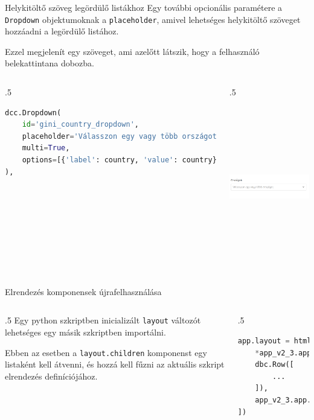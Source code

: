 \documentclass[english, aspectratio=169]{beamer}
\begin{document}
\begin{frame}[fragile]{Helykitöltő szöveg legördülő listákhoz}
	Egy további opcionális paramétere a \texttt{Dropdown} objektumoknak a \texttt{placeholder}, amivel lehetséges helykitöltő szöveget hozzáadni a legördülő listához.\par\smallskip
	Ezzel megjelenít egy szöveget, ami azelőtt látszik, hogy a felhasználó belekattintana dobozba.
	\begin{columns}
		\begin{column}{.5\textwidth}
			\begin{lstlisting}[language=python]
dcc.Dropdown(
	id='gini_country_dropdown',
	placeholder='Válasszon egy vagy több országot',
	multi=True,
	options=[{'label': country, 'value': country} for country in gini_df['Country Name'].unique()]
),				
			\end{lstlisting}
		\end{column}
		\begin{column}{.5\textwidth}
			\begin{center}
				\includegraphics[width=7cm, height=7cm, keepaspectratio]{images/plots_26.png}
			\end{center}
		\end{column}
	\end{columns}
\end{frame}

\begin{frame}[fragile]{Elrendezés komponensek újrafelhasználása}
	\begin{columns}
		\begin{column}{.5\textwidth}
			Egy python szkriptben inicializált \texttt{layout} változót lehetséges egy másik szkriptben importálni.\par\medskip
			Ebben az esetben a \texttt{layout.children} komponenst egy listaként kell átvenni, és hozzá kell fűzni az aktuális szkript elrendezés definíciójához.
		\end{column}
		\begin{column}{.5\textwidth}
			\begin{lstlisting}[language=python]
app.layout = html.Div([
	*app_v2_3.app.layout.children[:-1],
	dbc.Row([
		...	
	]),
	app_v2_3.app.layout.children[-1]
])				
			\end{lstlisting}			
		\end{column}
	\end{columns}
\end{frame}
\end{document}

